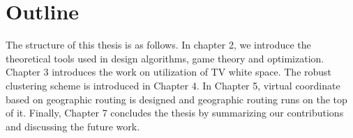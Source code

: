 



\section{Outline}
The structure of this thesis is as follows.
In chapter 2, we introduce the theoretical tools used in design algorithms, \ie game theory and optimization. 
Chapter 3 introduces the work on utilization of TV white space.
The robust clustering scheme is introduced in Chapter 4.
In Chapter 5, virtual coordinate based on geographic routing is designed and geographic routing runs on the top of it.
Finally, Chapter 7 concludes the thesis by summarizing our contributions and discussing the future work.




